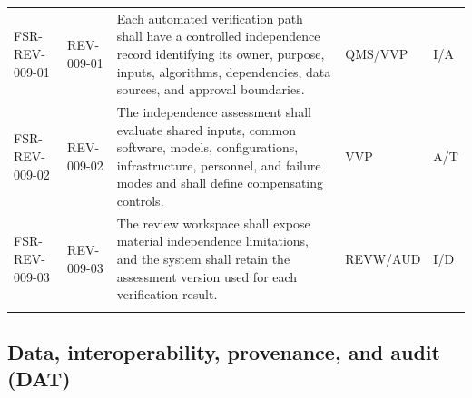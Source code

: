 \documentclass[11pt,letterpaper]{article}
\begin{document}
\begin{scriptsize}
\begin{longtable}{@{}L{0.16\textwidth}L{0.105\textwidth}L{0.435\textwidth}L{0.12\textwidth}L{0.08\textwidth}@{}}
\mbox{FSR-REV-009-01} & \mbox{REV-009-01} & Each automated verification path shall have a controlled independence record identifying its owner, purpose, inputs, algorithms, dependencies, data sources, and approval boundaries. & QMS\slash\allowbreak{}VVP & I\slash\allowbreak{}A \\
\addlinespace[2pt]
\mbox{FSR-REV-009-02} & \mbox{REV-009-02} & The independence assessment shall evaluate shared inputs, common software, models, configurations, infrastructure, personnel, and failure modes and shall define compensating controls. & VVP & A\slash\allowbreak{}T \\
\addlinespace[2pt]
\mbox{FSR-REV-009-03} & \mbox{REV-009-03} & The review workspace shall expose material independence limitations, and the system shall retain the assessment version used for each verification result. & REVW\slash\allowbreak{}AUD & I\slash\allowbreak{}D \\
\addlinespace[2pt]
\end{longtable}
\end{scriptsize}

\subsection{Data, interoperability, provenance, and audit (DAT)}
\end{document}
